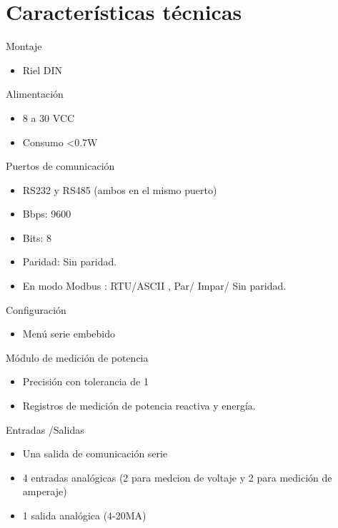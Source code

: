 \section{Características técnicas}
Montaje
\begin{itemize}
\item Riel DIN
\end{itemize}
Alimentación
\begin{itemize}
\item 8 a 30 VCC
\item Consumo <0.7W
\end{itemize}
Puertos de comunicación
\begin{itemize}
\item RS232 y RS485 (ambos en el mismo puerto)
\item Bbps: 9600
\item Bits: 8
\item Paridad: Sin paridad.
\item En modo Modbus : RTU/ASCII , Par/ Impar/ Sin paridad.
\end{itemize}
Configuración
\begin{itemize}
\item Menú serie embebido
\end{itemize}
Módulo de medición de potencia
\begin{itemize}
\item Precisión con tolerancia de 1%
\item Registros de medición de potencia reactiva y energía.
\end{itemize}
Entradas /Salidas
\begin{itemize}
\item Una salida de comunicación serie
\item 4 entradas analógicas (2 para medcion de voltaje y 2 para medición de amperaje)
\item 1 salida analógica (4-20MA)
\end{itemize}





